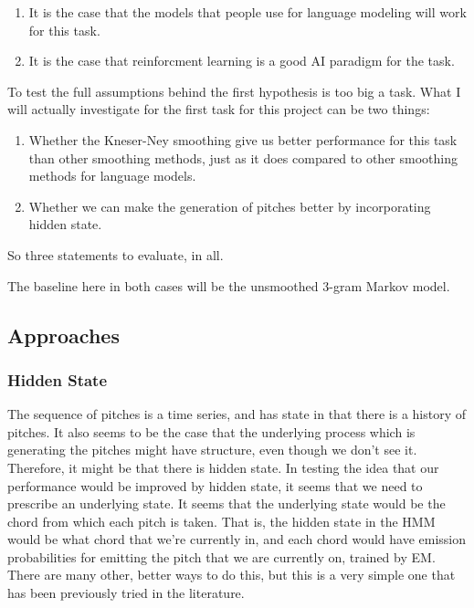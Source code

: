 \documentclass{article}
\begin{document}
\begin{enumerate}
    \item It is the case that the models that people use for language modeling will work for this task.
    \item It is the case that reinforcment learning is a good AI paradigm for the task.
\end{enumerate}

To test the full assumptions behind the first hypothesis is too big a task. What I will actually investigate for the first task for this project can be two things:

\begin{enumerate}
    \item Whether the Kneser-Ney smoothing give us better performance for this task than other smoothing methods, just as it does compared to other smoothing methods for language models.
    \item Whether we can make the generation of pitches better by incorporating hidden state.
\end{enumerate}

So three statements to evaluate, in all.

The baseline here in both cases will be the unsmoothed 3-gram Markov model. 

\subsection*{Approaches}

\subsubsection*{Hidden State}
The sequence of pitches is a time series, and has state in that there is a history of pitches. It also seems to be the case that the underlying process which is generating the pitches might have structure, even though we don't see it. Therefore, it might be that there is hidden state. In testing the idea that our performance would be improved by hidden state, it seems that we need to prescribe an underlying state\cite{Rabiner}. It seems that the underlying state would be the chord from which each pitch is taken. That is, the hidden state in the HMM would be what chord that we're currently in, and each chord would have emission probabilities for emitting the pitch that we are currently on, trained by EM. There are many other, better ways to do this, but this is a very simple one that has been previously tried in the literature\cite{Schulze}.
\end{document}

